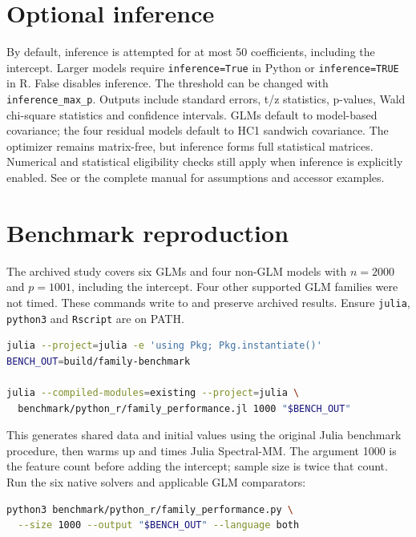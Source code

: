 \documentclass[10pt,a4paper]{article}
\begin{document}
\section{Optional inference}
By default, inference is attempted for at most 50 coefficients, including the
intercept. Larger models require \texttt{inference=True} in Python or
\texttt{inference=TRUE} in R. False disables inference. The threshold can be
changed with \texttt{inference\_max\_p}. Outputs include standard errors,
t/z statistics, p-values, Wald chi-square statistics and confidence intervals.
GLMs default to model-based covariance; the four residual models default to HC1
sandwich covariance. The optimizer remains matrix-free, but inference forms full
statistical matrices. Numerical and statistical eligibility checks still apply
when inference is explicitly enabled. See  or the complete
 manual for assumptions and accessor examples.

\section{Benchmark reproduction}\label{sec:benchmark}
The archived study covers six GLMs and four non-GLM models with $n=2000$ and
$p=1001$, including the intercept. Four other supported GLM families were not timed.
These commands write to  and preserve archived results.
Ensure \texttt{julia}, \texttt{python3} and \texttt{Rscript} are on PATH.

\begin{lstlisting}[language=bash]
julia --project=julia -e 'using Pkg; Pkg.instantiate()'
BENCH_OUT=build/family-benchmark

julia --compiled-modules=existing --project=julia \
  benchmark/python_r/family_performance.jl 1000 "$BENCH_OUT"
\end{lstlisting}

This generates shared data and initial values using the original Julia benchmark
procedure, then warms up and times Julia Spectral-MM. The argument 1000 is the
feature count before adding the intercept; sample size is twice that count.
Run the six native solvers and applicable GLM comparators:

\begin{lstlisting}[language=bash]
python3 benchmark/python_r/family_performance.py \
  --size 1000 --output "$BENCH_OUT" --language both
\end{lstlisting}
\end{document}
